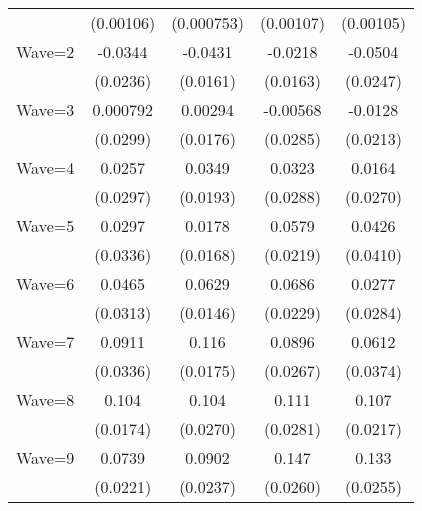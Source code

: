 {\begin{tabular}{l*{4}{c}}
                    &   (0.00106)         &  (0.000753)         &   (0.00107)         &   (0.00105)         \\
[1em]
Wave=2              &     -0.0344         &     -0.0431\sym{**} &     -0.0218         &     -0.0504\sym{*}  \\
                    &    (0.0236)         &    (0.0161)         &    (0.0163)         &    (0.0247)         \\
[1em]
Wave=3              &    0.000792         &     0.00294         &    -0.00568         &     -0.0128         \\
                    &    (0.0299)         &    (0.0176)         &    (0.0285)         &    (0.0213)         \\
[1em]
Wave=4              &      0.0257         &      0.0349         &      0.0323         &      0.0164         \\
                    &    (0.0297)         &    (0.0193)         &    (0.0288)         &    (0.0270)         \\
[1em]
Wave=5              &      0.0297         &      0.0178         &      0.0579\sym{**} &      0.0426         \\
                    &    (0.0336)         &    (0.0168)         &    (0.0219)         &    (0.0410)         \\
[1em]
Wave=6              &      0.0465         &      0.0629\sym{***}&      0.0686\sym{**} &      0.0277         \\
                    &    (0.0313)         &    (0.0146)         &    (0.0229)         &    (0.0284)         \\
[1em]
Wave=7              &      0.0911\sym{**} &       0.116\sym{***}&      0.0896\sym{***}&      0.0612         \\
                    &    (0.0336)         &    (0.0175)         &    (0.0267)         &    (0.0374)         \\
[1em]
Wave=8              &       0.104\sym{***}&       0.104\sym{***}&       0.111\sym{***}&       0.107\sym{***}\\
                    &    (0.0174)         &    (0.0270)         &    (0.0281)         &    (0.0217)         \\
[1em]
Wave=9              &      0.0739\sym{***}&      0.0902\sym{***}&       0.147\sym{***}&       0.133\sym{***}\\
                    &    (0.0221)         &    (0.0237)         &    (0.0260)         &    (0.0255)         \\

\end{tabular}}
